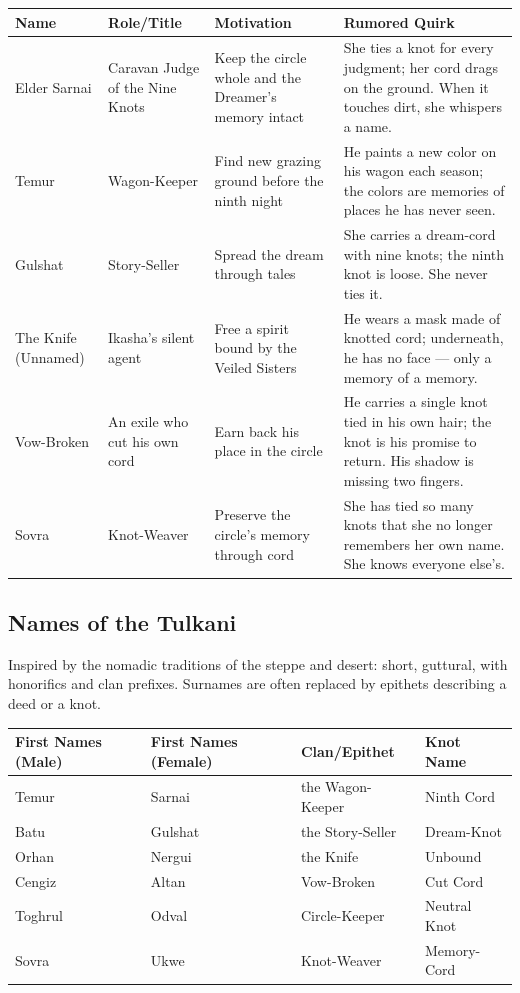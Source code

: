 \begin{longtable}{|p{}|p{}|p{}|p{}|}
\hline
\textbf{Name} & \textbf{Role/Title} & \textbf{Motivation} & \textbf{Rumored Quirk} \\
\hline
Elder Sarnai & Caravan Judge of the Nine Knots & Keep the circle whole and the Dreamer's memory intact & She ties a knot for every judgment; her cord drags on the ground. When it touches dirt, she whispers a name. \\
\hline
Temur & Wagon-Keeper & Find new grazing ground before the ninth night & He paints a new color on his wagon each season; the colors are memories of places he has never seen. \\
\hline
Gulshat & Story-Seller & Spread the dream through tales & She carries a dream-cord with nine knots; the ninth knot is loose. She never ties it. \\
\hline
The Knife (Unnamed) & Ikasha's silent agent & Free a spirit bound by the Veiled Sisters & He wears a mask made of knotted cord; underneath, he has no face --- only a memory of a memory. \\
\hline
Vow-Broken & An exile who cut his own cord & Earn back his place in the circle & He carries a single knot tied in his own hair; the knot is his promise to return. His shadow is missing two fingers. \\
\hline
Sovra & Knot-Weaver & Preserve the circle's memory through cord & She has tied so many knots that she no longer remembers her own name. She knows everyone else's. \\
\hline
\end{longtable}

\subsection*{Names of the Tulkani}
\label{sec:tulkani-names}

Inspired by the nomadic traditions of the steppe and desert: short, guttural, with honorifics and clan prefixes. Surnames are often replaced by epithets describing a deed or a knot.

\begin{longtable}{|p{}|p{}|p{}|p{}|}
\hline
\textbf{First Names (Male)} & \textbf{First Names (Female)} & \textbf{Clan/Epithet} & \textbf{Knot Name} \\
\hline
Temur & Sarnai & the Wagon-Keeper & Ninth Cord \\
\hline
Batu & Gulshat & the Story-Seller & Dream-Knot \\
\hline
Orhan & Nergui & the Knife & Unbound \\
\hline
Cengiz & Altan & Vow-Broken & Cut Cord \\
\hline
Toghrul & Odval & Circle-Keeper & Neutral Knot \\
\hline
Sovra & Ukwe & Knot-Weaver & Memory-Cord \\
\hline
\end{longtable}


